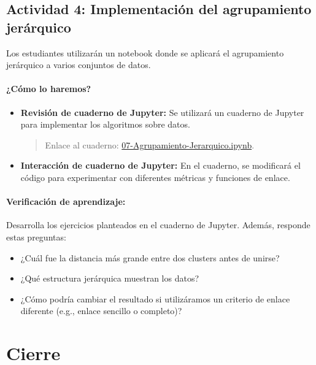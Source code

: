 \documentclass[a4,11pt]{aleph-notas}
\begin{document}
\subsection*{Actividad 4: Implementación del agrupamiento jerárquico}

Los estudiantes utilizarán un notebook donde se aplicará el agrupamiento jerárquico a varios conjuntos de datos.

\paragraph{¿Cómo lo haremos?}  
\begin{itemize}[leftmargin=*]
    \item \textbf{Revisión de cuaderno de Jupyter:}  
    Se utilizará un cuaderno de Jupyter para implementar los algoritmos sobre datos.
    \begin{quote}
        Enlace al cuaderno: \href{https://colab.research.google.com/github/andres-merino/AprendizajeAutomaticoInicial-05-N0105/blob/main/2-Notebooks/07-Agrupamiento-Jerarquico.ipynb}{07-Agrupamiento-Jerarquico.ipynb}.
    \end{quote}
    \item \textbf{Interacción de cuaderno de Jupyter:}  
    En el cuaderno, se modificará el código para experimentar con diferentes métricas y funciones de enlace.
\end{itemize}

\paragraph{Verificación de aprendizaje:}  
Desarrolla los ejercicios planteados en el cuaderno de Jupyter. Además, responde estas preguntas:
\begin{itemize}[leftmargin=*]
    \item ¿Cuál fue la distancia más grande entre dos clusters antes de unirse?
    \item ¿Qué estructura jerárquica muestran los datos?
    \item ¿Cómo podría cambiar el resultado si utilizáramos un criterio de enlace diferente (e.g., enlace sencillo o completo)?
\end{itemize}






\section*{Cierre}
\end{document}
